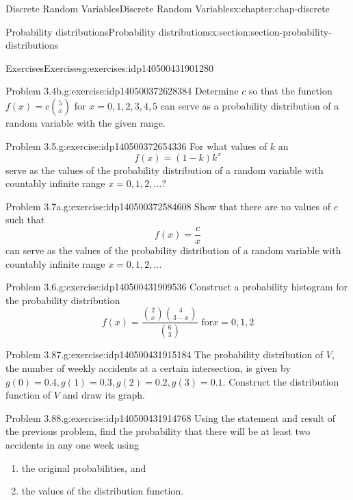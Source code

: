 \documentclass[oneside,10pt,]{book}
\begin{document}
\begin{chapterptx}{Discrete Random Variables}{}{Discrete Random Variables}{}{}{x:chapter:chap-discrete}
\begin{sectionptx}{Probability distributions}{}{Probability distributions}{}{}{x:section:section-probability-distributions}
\begin{exercises-subsection}{Exercises}{}{Exercises}{}{}{g:exercises:idp140500431901280}
\begin{divisionexercise}{3}{Problem 3.4b.}{}{g:exercise:idp140500372628384}%
Determine \(c\) so that the function \(\displaystyle f(x) =
c{5\choose x}\) for \(x = 0, 1, 2, 3, 4, 5\) can serve as a probability distribution of a random variable with the given range.%
\end{divisionexercise}%
\begin{divisionexercise}{4}{Problem 3.5.}{}{g:exercise:idp140500372654336}%
For what values of \(k\) an%
\begin{equation*}
f(x) = (1-k)k^x
\end{equation*}
serve as the values of the probability distribution of a random variable with countably infinite range \(x = 0, 1, 2, \dots\)?%
\end{divisionexercise}%
\begin{divisionexercise}{5}{Problem 3.7a.}{}{g:exercise:idp140500372584608}%
Show that there are no values of \(c\) such that%
\begin{equation*}
f(x) =
\dfrac{c}{x}
\end{equation*}
can serve as the values of the probability distribution of a random variable with countably infinite range \(x = 0, 1, 2, \dots\)%
\end{divisionexercise}%
\begin{divisionexercise}{6}{Problem 3.6.}{}{g:exercise:idp140500431909536}%
Construct a probability histogram for the probability distribution%
\begin{equation*}
f(x) = \dfrac{{2\choose x}{4\choose{3-x}}}{{6\choose3}} \text{ for
}x=0, 1, 2
\end{equation*}
%
\end{divisionexercise}%
\begin{divisionexercise}{7}{Problem 3.87.}{}{g:exercise:idp140500431915184}%
The probability distribution of \(V\), the number of weekly accidents at a certain intersection, is given by \(g(0) = 0.4, g(1) =
0.3, g(2) = 0.2, g(3) = 0.1\). Construct the distribution function of \(V\) and draw its graph.%
\end{divisionexercise}%
\begin{divisionexercise}{8}{Problem 3.88.}{}{g:exercise:idp140500431914768}%
Using the statement and result of the previous problem, find the probability that there will be at least two accidents in any one week using%
\begin{enumerate}[label=(\alph*)]
\item{}the original probabilities, and%
\item{}the values of the distribution function.%

\end{enumerate}
\end{divisionexercise}
\end{exercises-subsection}
\end{sectionptx}
\end{chapterptx}
\end{document}
